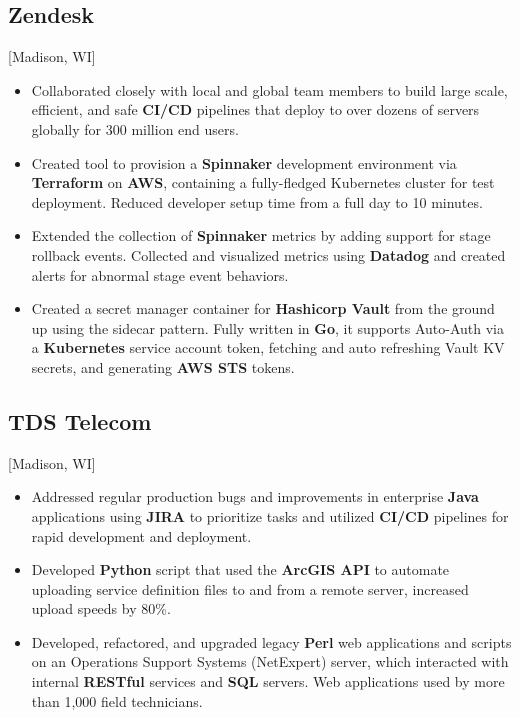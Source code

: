 \documentclass{mycv}
\begin{document}
\subsection{Zendesk}[Madison, WI]
\begin{positions}
\end{positions}
\begin{itemize}
  \item {
     Collaborated closely with local and global team members to build large scale, efficient, and safe \textbf{CI/CD} pipelines that deploy to over dozens of servers globally for 300 million end users.
  }
  \item {
  Created tool to provision a \textbf{Spinnaker} development environment via \textbf{Terraform} on \textbf{AWS}, containing a fully-fledged Kubernetes cluster for test deployment. Reduced developer setup time from a full day to 10 minutes. 
  }
  \item {
  Extended the collection of \textbf{Spinnaker} metrics by adding support for stage rollback events. Collected and visualized metrics using \textbf{Datadog} and created alerts for abnormal stage event behaviors. 
  }
  \item {
  Created a secret manager container for \textbf{Hashicorp Vault} from the ground up using the sidecar pattern. Fully written in \textbf{Go}, it supports Auto-Auth via a \textbf{Kubernetes} service account token, fetching and auto refreshing Vault KV secrets, and generating \textbf{AWS STS} tokens.
  }
 \end{itemize}
  
\subsection{TDS Telecom}[Madison, WI]
\begin{positions}
\end{positions}
\begin{itemize}
  \item {
  Addressed regular production bugs and improvements in enterprise \textbf{Java}
applications using \textbf{JIRA} to prioritize tasks and utilized \textbf{CI/CD} pipelines for
rapid development and deployment.
  }
  \item {
  Developed \textbf{Python} script that used the \textbf{ArcGIS API} to automate uploading
service definition files to and from a remote server, increased upload speeds
by 80\%.
}
  \item {
  Developed, refactored, and upgraded legacy \textbf{Perl} web applications and scripts
on an Operations Support Systems (NetExpert) server, which interacted with
internal \textbf{RESTful} services and \textbf{SQL} servers. Web applications used by more than 1,000
field technicians.
  }
\end{itemize}
\end{document}
